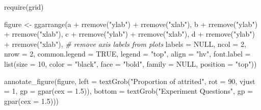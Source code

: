 \documentclass[
]{article}
\newenvironment{Shaded}{\begin{snugshade}}{\end{snugshade}}
\newcommand{\AttributeTok}[1]{\textcolor[rgb]{0.77,0.63,0.00}{#1}}
\newcommand{\CommentTok}[1]{\textcolor[rgb]{0.56,0.35,0.01}{\textit{#1}}}
\newcommand{\ConstantTok}[1]{\textcolor[rgb]{0.00,0.00,0.00}{#1}}
\newcommand{\DecValTok}[1]{\textcolor[rgb]{0.00,0.00,0.81}{#1}}
\newcommand{\FloatTok}[1]{\textcolor[rgb]{0.00,0.00,0.81}{#1}}
\newcommand{\FunctionTok}[1]{\textcolor[rgb]{0.00,0.00,0.00}{#1}}
\newcommand{\NormalTok}[1]{#1}
\newcommand{\OtherTok}[1]{\textcolor[rgb]{0.56,0.35,0.01}{#1}}
\newcommand{\SpecialCharTok}[1]{\textcolor[rgb]{0.00,0.00,0.00}{#1}}
\newcommand{\StringTok}[1]{\textcolor[rgb]{0.31,0.60,0.02}{#1}}
\begin{document}
\begin{Shaded}
\begin{Highlighting}[]
\FunctionTok{require}\NormalTok{(grid)}

\NormalTok{figure }\OtherTok{\textless{}{-}} \FunctionTok{ggarrange}\NormalTok{(a }\SpecialCharTok{+} \FunctionTok{rremove}\NormalTok{(}\StringTok{"ylab"}\NormalTok{) }\SpecialCharTok{+} \FunctionTok{rremove}\NormalTok{(}\StringTok{"xlab"}\NormalTok{), b }\SpecialCharTok{+} \FunctionTok{rremove}\NormalTok{(}\StringTok{"ylab"}\NormalTok{) }
                    \SpecialCharTok{+} \FunctionTok{rremove}\NormalTok{(}\StringTok{"xlab"}\NormalTok{), c }\SpecialCharTok{+} \FunctionTok{rremove}\NormalTok{(}\StringTok{"ylab"}\NormalTok{) }\SpecialCharTok{+} \FunctionTok{rremove}\NormalTok{(}\StringTok{"xlab"}\NormalTok{), }
\NormalTok{                    d }\SpecialCharTok{+} \FunctionTok{rremove}\NormalTok{(}\StringTok{"ylab"}\NormalTok{) }\SpecialCharTok{+} \FunctionTok{rremove}\NormalTok{(}\StringTok{"xlab"}\NormalTok{), }\CommentTok{\# remove axis labels from plots}
                    \AttributeTok{labels =} \ConstantTok{NULL}\NormalTok{,}
                    \AttributeTok{ncol =} \DecValTok{2}\NormalTok{, }\AttributeTok{nrow =} \DecValTok{2}\NormalTok{,}
                    \AttributeTok{common.legend =} \ConstantTok{TRUE}\NormalTok{, }\AttributeTok{legend =} \StringTok{"top"}\NormalTok{,}
                    \AttributeTok{align =} \StringTok{"hv"}\NormalTok{, }
                    \AttributeTok{font.label =} \FunctionTok{list}\NormalTok{(}\AttributeTok{size =} \DecValTok{10}\NormalTok{, }\AttributeTok{color =} \StringTok{"black"}\NormalTok{, }\AttributeTok{face =} \StringTok{"bold"}\NormalTok{, }
                                      \AttributeTok{family =} \ConstantTok{NULL}\NormalTok{, }\AttributeTok{position =} \StringTok{"top"}\NormalTok{))}

\FunctionTok{annotate\_figure}\NormalTok{(figure, }\AttributeTok{left =} \FunctionTok{textGrob}\NormalTok{(}\StringTok{"Proportion of attrited"}\NormalTok{, }\AttributeTok{rot =} \DecValTok{90}\NormalTok{, }\AttributeTok{vjust =} \DecValTok{1}\NormalTok{, }\AttributeTok{gp =} \FunctionTok{gpar}\NormalTok{(}\AttributeTok{cex =} \FloatTok{1.5}\NormalTok{)),}
                    \AttributeTok{bottom =} \FunctionTok{textGrob}\NormalTok{(}\StringTok{"Experiment Questions"}\NormalTok{, }\AttributeTok{gp =} \FunctionTok{gpar}\NormalTok{(}\AttributeTok{cex =} \FloatTok{1.5}\NormalTok{)))}
\end{Highlighting}
\end{Shaded}
\end{document}
